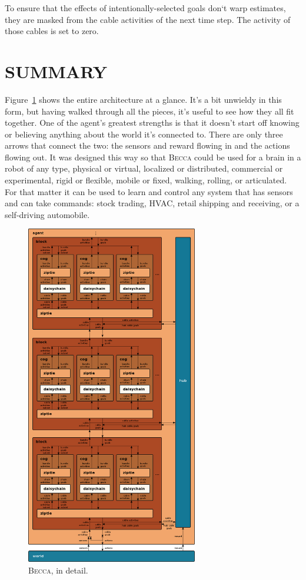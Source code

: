 \documentclass[oneside,twocolumn]{article}
\begin{document}
To ensure that the effects of intentionally-selected goals don`t warp estimates, they are masked from the cable activities of the next time step. The activity of those cables is set to zero.

\section*{\color{copper} SUMMARY}

Figure~\ref{becca} shows the entire architecture at a glance. It's a bit unwieldy in this form, but having walked through all the pieces, it's useful to see how they all fit together. One of the agent's greatest strengths is that it doesn't start off knowing or believing anything about the world it's connected to. There are only three arrows that connect the two: the sensors and reward flowing in and the actions flowing out. It was designed this way so that \textsc{Becca} could be used for a brain in a robot of any type, physical or virtual, localized or distributed, commercial or experimental, rigid or flexible, mobile or fixed, walking, rolling, or articulated. For that matter it can be used to learn and control any system that has sensors and can take commands: stock trading, HVAC, retail shipping and receiving, or a self-driving  automobile.

\begin{figure}[ht]
\centering
\includegraphics[height=15.0cm]{figs/becca.png}
\caption{\textsc{Becca}, in detail.}
\label{becca}
\end{figure}





%
%
\end{document}
